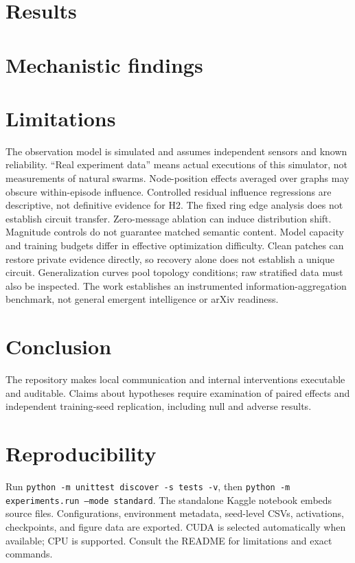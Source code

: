 \documentclass[11pt]{article}
\begin{document}
\section{Results}
\section{Mechanistic findings}
\section{Limitations}
The observation model is simulated and assumes independent sensors and known reliability. ``Real experiment data'' means actual executions of this simulator, not measurements of natural swarms. Node-position effects averaged over graphs may obscure within-episode influence. Controlled residual influence regressions are descriptive, not definitive evidence for H2. The fixed ring edge analysis does not establish circuit transfer. Zero-message ablation can induce distribution shift. Magnitude controls do not guarantee matched semantic content. Model capacity and training budgets differ in effective optimization difficulty. Clean patches can restore private evidence directly, so recovery alone does not establish a unique circuit. Generalization curves pool topology conditions; raw stratified data must also be inspected. The work establishes an instrumented information-aggregation benchmark, not general emergent intelligence or arXiv readiness.
\section{Conclusion}
The repository makes local communication and internal interventions executable and auditable. Claims about hypotheses require examination of paired effects and independent training-seed replication, including null and adverse results.
\appendix
\section{Reproducibility}
Run \texttt{python -m unittest discover -s tests -v}, then \texttt{python -m experiments.run --mode standard}. The standalone Kaggle notebook embeds source files. Configurations, environment metadata, seed-level CSVs, activations, checkpoints, and figure data are exported. CUDA is selected automatically when available; CPU is supported. Consult the README for limitations and exact commands.
\end{document}
